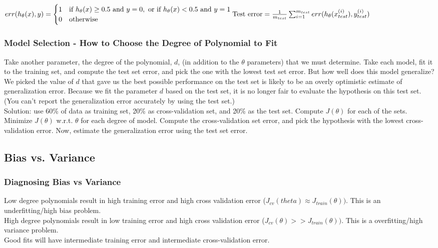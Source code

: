 \documentclass[11pt,letterpaper]{article}
\begin{document}
\( err(h_\theta(x), y) =
\begin{cases}
      1 & \textrm{if } h_\theta(x) \geq 0.5 \textrm{ and } y = 0, \textrm{ or if } h_\theta(x) < 0.5 \textrm { and } y = 1\\
      0 & \textrm{otherwise}
\end{cases} \\
\textrm{Test error} = \frac{1}{m	_{test}} \sum_{i=1}^{m_{test}}err(h_\theta(x_{test}^{(i)}), y_{test}^{(i)})
\)

\subsubsection{Model Selection - How to Choose the Degree of Polynomial to Fit}
Take another parameter, the degree of the polynomial, $d$, (in addition to the $\theta$ parameters) that we must determine. Take each model, fit it to the training set, and compute the test set error, and pick the one with the lowest test set error. But how well does this model generalize? We picked the value of $d$ that gave us the best possible performance on the test set is likely to be an overly optimistic estimate of generalization error. Because we fit the parameter $d$ based on the test set, it is no longer fair to evaluate the hypothesis on this test set. (You can't report the generalization error accurately by using the test set.) \\
Solution: use 60\% of data as training set, 20\% as cross-validation set, and 20\% as the test set. Compute $J(\theta)$ for each of the sets. Minimize $J(\theta)$ w.r.t. $\theta$ for each degree of model. Compute the cross-validation set error, and pick the hypothesis with the lowest cross-validation error. Now, estimate the generalization error using the test set error.

\subsection{Bias vs. Variance}
\subsubsection{Diagnosing Bias vs Variance}
Low degree polynomials result in high training error and high cross validation error ($J_{cv}(theta) \approx J_{train}(\theta))$. This is an underfitting/high bias problem.\\
High degree polynomials result in low training error and high cross validation error ($J_{cv}(\theta) >> J_{train}(\theta))$. This is a overfitting/high variance problem.\\
Good fits will have intermediate training error and intermediate cross-validation error.
\end{document}
